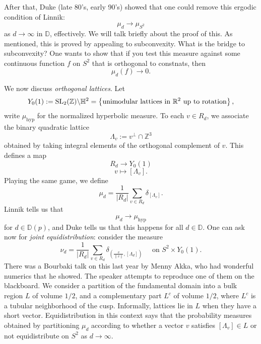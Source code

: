 \documentclass[reqno]{amsart} 
\begin{document}
After that, Duke (late 80's, early 90's) showed that one could remove this ergodic condition of Linnik:
\begin{equation*}
  \mu_d \rightarrow \mu_{S^2}
\end{equation*}
as $d \rightarrow \infty $ in $\mathbb{D}$, effectively.  We will talk briefly about the proof of this.  As mentioned, this is proved by appealing to subconvexity.  What is the bridge to subconvexity?  One wants to show that if you test this measure against some continuous function $f$ on $S^2$ that is orthogonal to constnats, then
\begin{equation*}
  \mu_d (f) \rightarrow 0.
\end{equation*}

We now discuss \emph{orthogonal lattices}.  Let
\begin{equation*}
  Y_0(1) := \operatorname{SL}_2(\mathbb{Z}) \backslash \mathbb{H}^2 = \left\{ \text{unimodular lattices in $\mathbb{R}^2$ up to rotation} \right\},
\end{equation*}
write $\mu_{\mathrm{hyp}}$ for the normalized hyperbolic measure.  To each $v \in R_d$, we associate the binary quadratic lattice
\begin{equation*}
  \Lambda_v := v^\perp \cap \mathbb{Z}^3
\end{equation*}
obtained by taking integral elements of the orthogonal complement of $v$.  This defines a map
\begin{equation*}
  R_d \rightarrow Y_0 (1) 
\end{equation*}
\begin{equation*}
  v \mapsto [\Lambda_v ].
\end{equation*}
Playing the same game, we define
\begin{equation*}
  \mu_d = \frac{1}{\lvert R_d  \rvert} \sum_{v \in R_d }
  \delta_{[\Lambda_v ]}.
\end{equation*}
Linnik tells us that
\begin{equation*}
  \mu_d \rightarrow \mu_{\mathrm{hyp}}
\end{equation*}
for $d \in \mathbb{D} (p)$, and Duke tells us that this happens for all $d \in \mathbb{D} $.  One can ask now for \emph{joint equidistribution}: consider the measure
\begin{equation*}
  \nu_d = \frac{1}{ \lvert R_d  \rvert} \sum_{v \in R_d } \delta_{\left( \frac{v }{ \lVert v \rVert} , [\Lambda_d ] \right)}
  \quad \text{ on }
  S^2 \times Y_0 (1).
\end{equation*}
There was a Bourbaki talk on this last year by Menny Akka, who had wonderful numerics that he showed.  The speaker attempts to reproduce one of them on the blackboard.  We consider a partition of the fundamental domain into a bulk region $L$ of volume $1/2$, and a complementary part $L^c$ of volume $1/2$, where $L^c$ is a tubular neighborhood of the cusp.  Informally, lattices lie in $L$ when they have a short vector.  Equidistribution in this context says that the probability measures obtained by partitioning $\mu_d$ according to whether a vector $v$ satisfies $[\Lambda_v] \in L$ or not equidistribute on $S^2$ as $d \rightarrow \infty$.
\end{document}
